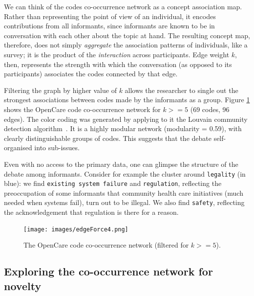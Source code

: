 \documentclass{llncs}
\begin{document}
We can think of the codes co-occurrence network as a concept association map. Rather than representing the point of view of an individual, it encodes contributions from all informants, since informants are known to be in conversation with each other about the topic at hand. The resulting concept map, therefore, does not simply \emph{aggregate} the association patterns of individuals, like a survey; it is the product of the \emph{interaction} across participants. Edge weight $k$, then, represents the strength with which the conversation (as opposed to its participants) associates the codes connected by that edge. 

Filtering the graph by higher value of $k$ allows the researcher to single out the strongest associations between codes made by the informants as a group. Figure \ref{fig:NetViz} shows the OpenCare code co-occurrence network for $k>=5$ (69 codes, 96 edges). The color coding was generated by applying to it the Louvain community detection algorithm~\cite{blondel2008fast}. It is a highly modular network (modularity = 0.59), with clearly distinguishable groups of codes. This suggests that the debate self-organised into sub-issues.  

Even with no access to the primary data, one can glimpse the structure of the debate among informants. Consider for example the cluster around \texttt{legality} (in blue): we find \texttt{existing system failure} and \texttt{regulation}, reflecting the preoccupation of some informants that community health care initiatives (much needed when systems fail), turn out to be illegal. We also find \texttt{safety}, reflecting the acknowledgement that regulation is there for a reason.

\begin{figure}[h!]
\centering
\texttt{[image: images/edgeForce4.png]}
\caption{The OpenCare code co-occurrence network (filtered for $k>=5$).}
\label{fig:NetViz}
\end{figure}

\subsection{Exploring the co-occurrence network for novelty} \label{ssec_exploring_novelty}

\end{document}

